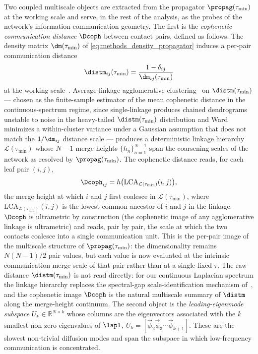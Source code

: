 Two coupled multiscale objects are extracted from the propagator \(\propag(\tau_{\min})\) at the working scale and serve, in the rest of the analysis, as the probes of the network's information-communication geometry. The first is the \emph{cophenetic communication distance} \(\Dcoph\) between contact pairs, defined as follows. The density matrix \(\dm(\tau_{\min})\) of \eqref{eq:methods_density_propagator} induces a per-pair communication distance
\begin{equation}
    \distm_{ij}(\tau_{\min}) = \frac{1 - \delta_{ij}}{\dm_{ij}(\tau_{\min})}
    \label{eq:methods_distm}
\end{equation}
at the working scale~\cite{villegas2025multiscale}. Average-linkage agglomerative clustering~\cite{kaufman2009finding} on \(\distm(\tau_{\min})\) --- chosen as the finite-sample estimator of the mean cophenetic distance in the continuous-spectrum regime, since single-linkage produces chained dendrograms unstable to noise in the heavy-tailed \(\distm(\tau_{\min})\) distribution and Ward minimizes a within-cluster variance under a Gaussian assumption that does not match the \(1/\dm_{ij}\) distance scale --- produces a deterministic linkage hierarchy \(\mathcal{L}(\tau_{\min})\) whose \(N-1\) merge heights \(\{h_{n}\}_{n=1}^{N-1}\) span the coarsening scales of the network as resolved by \(\propag(\tau_{\min})\). The cophenetic distance reads, for each leaf pair \((i,j)\),
\begin{equation}
    \Dcoph_{ij} = h\bigl(\mathrm{LCA}_{\mathcal{L}(\tau_{\min})}(i,j)\bigr),
    \label{eq:methods_distm_coph}
\end{equation}
the merge height at which \(i\) and \(j\) first coalesce in \(\mathcal{L}(\tau_{\min})\), where \(\mathrm{LCA}_{\mathcal{L}(\tau_{\min})}(i,j)\) is the lowest common ancestor of \(i\) and \(j\) in the linkage. \(\Dcoph\) is ultrametric by construction (the cophenetic image of any agglomerative linkage is ultrametric) and reads, pair by pair, the scale at which the two contacts coalesce into a single communication unit. This is the per-pair image of the multiscale structure of \(\propag(\tau_{\min})\): the dimensionality remains \(N(N-1)/2\) pair values, but each value is now evaluated at the intrinsic communication-merge scale of that pair rather than at a single fixed \(\tau\). The raw distance \(\distm(\tau_{\min})\) is not read directly: for our continuous Laplacian spectrum the linkage hierarchy replaces the spectral-gap scale-identification mechanism of~\cite{villegas2025multiscale}, and the cophenetic image \(\Dcoph\) is the natural multiscale summary of \(\distm\) along the merge-height continuum. The second object is the \emph{leading-eigenmode subspace} \(U_{k} \in \mathbb{R}^{N \times k}\) whose columns are the eigenvectors associated with the \(k\) smallest non-zero eigenvalues of \(\lapl\), \(U_{k} = [\vec{\phi}_{2}  \vec{\phi}_{3}  \cdots  \vec{\phi}_{k+1}]\). These are the slowest non-trivial diffusion modes and span the subspace in which low-frequency communication is concentrated.

